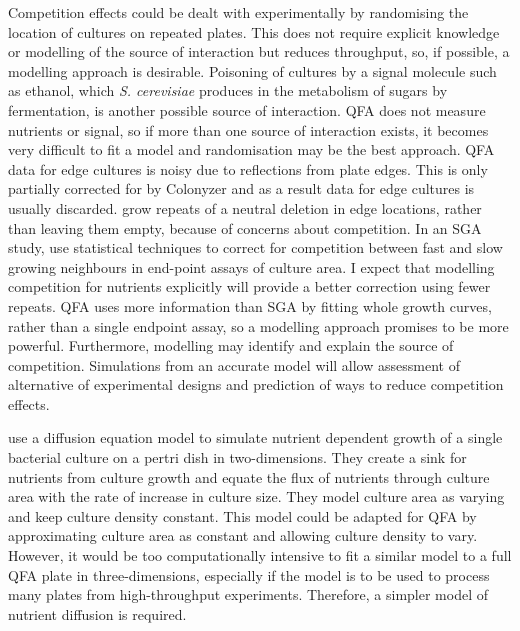 Competition effects could be dealt with experimentally by randomising
the location of cultures on repeated plates. This does not require
explicit knowledge or modelling of the source of interaction but
reduces throughput, so, if possible, a modelling approach is
desirable. Poisoning of cultures by a signal molecule such as ethanol,
which \textit{S. cerevisiae} produces in the metabolism of sugars by
fermentation, is another possible source of interaction.
QFA does not measure nutrients or signal, so if more than one source
of interaction exists, it becomes very difficult to fit a model and
randomisation may be the best approach. QFA data for edge cultures is
noisy due to reflections from plate edges. This is only partially
corrected for by Colonyzer \citep{Lawless2010} and as a result data
for edge cultures is usually discarded. \citet{Addinall2011} grow
repeats of a neutral deletion in edge locations, rather than leaving
them empty, because of concerns about competition. In an SGA study,
\citet{Baryshnikova2010} use statistical techniques to correct for
competition between fast and slow growing neighbours in end-point
assays of culture area. I expect that modelling competition for
nutrients explicitly will provide a better correction using fewer
repeats. QFA uses more information than SGA by fitting whole growth
curves, rather than a single endpoint assay, so a modelling approach
promises to be more powerful. Furthermore, modelling may identify and
explain the source of competition. Simulations from an accurate model
will allow assessment of alternative of experimental designs and
prediction of ways to reduce competition effects.



\citet{Reo2014} use a diffusion equation model to simulate nutrient
dependent growth of a single bacterial culture on a pertri dish in
two-dimensions. They create a sink for nutrients from culture growth
and equate the flux of nutrients through culture area with the rate of
increase in culture size. They model culture area as varying and keep
culture density constant. This model could be adapted for QFA by
approximating culture area as constant and allowing culture density to
vary. However, it would be too computationally intensive to fit a
similar model to a full QFA plate in three-dimensions, especially if
the model is to be used to process many plates from high-throughput
experiments. Therefore, a simpler model of nutrient diffusion is
required.


